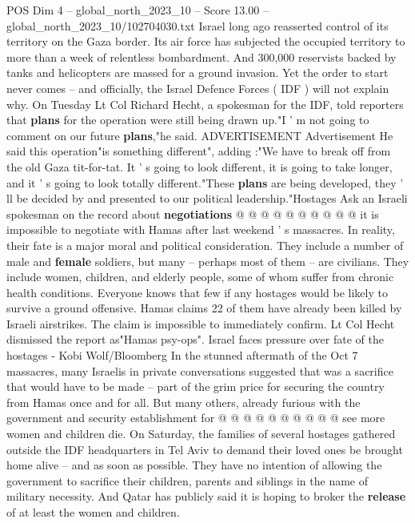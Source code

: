 \begin{textsample}{POS Dim 4 – global\_north\_2023\_10 – Score 13.00 – global\_north\_2023\_10/102704030.txt}  \label{ex:f4_pos_447}
Israel long ago reasserted control of its territory on the Gaza border.
Its air force has subjected the occupied territory to more than a week of relentless bombardment.
And 300,000 reservists backed by tanks and helicopters are massed for a ground invasion.
Yet the order to start never comes -- and officially, the Israel Defence Forces ( IDF ) will not explain why.
On Tuesday Lt Col Richard Hecht, a spokesman for the IDF, told reporters that \textbf{plans} for the operation were still being drawn up."I ' m not going to comment on our future \textbf{plans},"he said.
ADVERTISEMENT Advertisement He said this operation"is something different", adding :"We have to break off from the old Gaza tit-for-tat.
It ' s going to look different, it is going to take longer, and it ' s going to look totally different."These \textbf{plans} are being developed, they ' ll be decided by and presented to our political leadership."Hostages Ask an Israeli spokesman on the record about \textbf{negotiations} @ @ @ @ @ @ @ @ @ @ it is impossible to negotiate with Hamas after last weekend ' s massacres.
In reality, their fate is a major moral and political consideration.
They include a number of male and \textbf{female} soldiers, but many -- perhaps most of them -- are civilians.
They include women, children, and elderly people, some of whom suffer from chronic health conditions.
Everyone knows that few if any hostages would be likely to survive a ground offensive.
Hamas claims 22 of them have already been killed by Israeli airstrikes.
The claim is impossible to immediately confirm.
Lt Col Hecht dismissed the report as"Hamas psy-ops".
Israel faces pressure over fate of the hostages - Kobi Wolf/Bloomberg In the stunned aftermath of the Oct 7 massacres, many Israelis in private conversations suggested that was a sacrifice that would have to be made -- part of the grim price for securing the country from Hamas once and for all.
But many others, already furious with the government and security establishment for @ @ @ @ @ @ @ @ @ @ see more women and children die.
On Saturday, the families of several hostages gathered outside the IDF headquarters in Tel Aviv to demand their loved ones be brought home alive -- and as soon as possible.
They have no intention of allowing the government to sacrifice their children, parents and siblings in the name of military necessity.
And Qatar has publicly said it is hoping to broker the \textbf{release} of at least the women and children.

\end{textsample}
